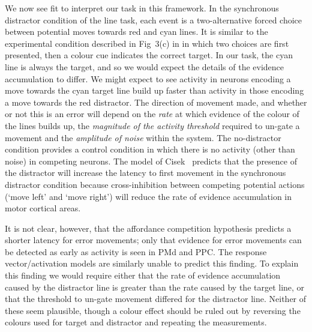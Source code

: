 \documentclass[10pt,letterpaper]{article}
\begin{document}
We now see fit to interpret our task in this framework. In the
synchronous distractor condition of the line task, each event is a
two-alternative forced choice between potential moves towards red and
cyan lines. It is similar to the experimental condition described in
Fig~3(c) in \cite{cisek_cortical_2007} in which two choices are first
presented, then a colour cue indicates the correct target. In our
task, the cyan line is always the target, and so we would expect the
details of the evidence accumulation to differ.  We might expect to
see activity in neurons encoding a move towards the cyan target line
build up faster than activity in those encoding a move towards the red
distractor. The direction of movement made, and whether or not this is
an error will depend on the \emph{rate} at which evidence of the
colour of the lines builds up, the \emph{magnitude of the activity
  threshold} required to un-gate a movement and the \emph{amplitude of
  noise} within the system. The no-distractor condition provides a
control condition in which there is no activity (other than noise) in
competing neurons. The model of Cisek~\cite{cisek_cortical_2007}
predicts that the presence of the distractor will increase the latency
to first movement in the synchronous distractor condition because
cross-inhibition between competing potential actions (`move left' and
`move right') will reduce the rate of evidence accumulation in motor
cortical areas.

It is not clear, however, that the affordance competition hypothesis
predicts a shorter latency for error movements; only that evidence for
error movements can be detected as early as activity is seen in PMd
and PPC. The response vector/activation models are similarly unable to
predict this finding. To explain this finding we would require either
that the rate of evidence accumulation caused by the distractor line
is greater than the rate caused by the target line, or that the
threshold to un-gate movement differed for the distractor
line. Neither of these seem plausible, though a colour effect should
be ruled out by reversing the colours used for target and distractor
and repeating the measurements.
\end{document}

